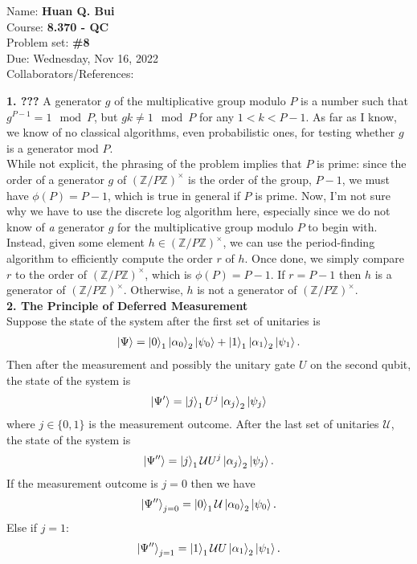 \documentclass{article}
\theoremstyle{definition}
\newcommand{\al}{\alpha}
\begin{document}
\begin{framed}
\noindent Name: \textbf{Huan Q. Bui}\\
Course: \textbf{8.370 - QC}\\
Problem set: \textbf{\#8}\\
Due: Wednesday, Nov 16, 2022\\
Collaborators/References:
\end{framed}



\noindent \textbf{1. ???}  A generator $g$ of the multiplicative group modulo $P$ is a number such that $g^{P -1} =
1 \mod P$, but $gk \neq 1 \mod P$ for any $1 < k < P -1$. As far as I know, we
	know of no classical algorithms, even probabilistic ones, for testing whether $g$ is
	a generator mod $P$.\\

\noindent While not explicit, the phrasing of the problem implies that $P$ is prime: since the order of a generator $g$ of $(\mathbb{Z}/P\mathbb{Z})^\times$ is the order of the group, $P-1$, we must have $\phi(P) = P-1$, which is true in general if $P$ is prime. Now, I'm not sure why we have to use the discrete log algorithm here, especially since we do not know of \textit{a} generator $g$ for the multiplicative group modulo $P$  to begin with. Instead, given some element $h\in (\mathbb{Z}/P\mathbb{Z})^\times$, we can use the period-finding algorithm to efficiently compute the order $r$ of $h$. Once done, we simply compare $r$ to the order of  $(\mathbb{Z}/P\mathbb{Z})^\times$, which is $\phi(P) = P-1$. If $r = P-1$ then $h$ is a generator of $(\mathbb{Z}/P\mathbb{Z})^\times$. Otherwise, $h$ is not a generator of  $(\mathbb{Z}/P\mathbb{Z})^\times$.\\


\noindent \textbf{2. The Principle of Deferred Measurement} \\

\noindent Suppose the state of the system after the first set of unitaries is 
\begin{align*}
	\ket{\Psi} = \ket{0}_1 \ket{\al_0}_2 \ket{\psi_0} + \ket{1}_1 \ket{\al_1}_2\ket{\psi_1}.
\end{align*}
Then after the measurement and possibly the unitary gate $U$ on the second qubit, the state of the system is 
\begin{align*}
	\ket{\Psi'} = \ket{j}_1 U^j \ket{\al_j}_2 \ket{\psi_j}
\end{align*}
where $j\in \{0,1\}$ is the measurement outcome. After the last set of unitaries $\mathcal{U}$, the state of the system is 
\begin{align*}
	\ket{\Psi''} = \ket{j}_1 \mathcal{U} U^j \ket{\al_j}_2 \ket{\psi_j}.
\end{align*}
If the measurement outcome is $j=0$ then we have
\begin{align*}
	\ket{\Psi''}_{j=0} =  \ket{0}_1 \mathcal{U} \ket{\al_0}_2 \ket{\psi_0}.
\end{align*}
Else if $j=1$:
\begin{align*}
	\ket{\Psi''}_{j=1} =  \ket{1}_1 \mathcal{U} U \ket{\al_1}_2 \ket{\psi_1}.
\end{align*}
\end{document}
